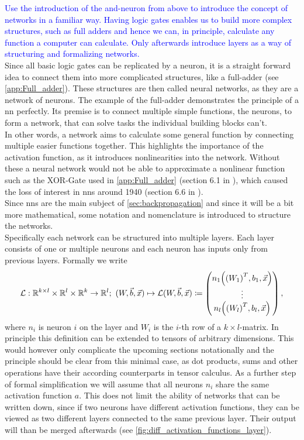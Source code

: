 \medskip
\textcolor{blue}{Use the introduction of the and-neuron from above to introduce the concept of networks in a familiar way. Having logic gates enables us to build more complex structures, such as full adders and hence we can, in principle, calculate any function a computer can calculate. Only afterwards introduce layers as a way of structuring and formalizing networks.}\\
\noindent Since all basic logic gates can be replicated by a neuron, it is a straight forward idea to connect them into more complicated structures, like a full-adder (see \autoref{app:Full_adder}). These structures are then called neural networks, as they are a network of neurons. The example of the full-adder demonstrates the principle of a \gls{nn} perfectly. Its premise is to connect multiple simple functions, the neurons, to form a network, that can solve tasks the individual building blocks can't.\\
In other words, a network aims to calculate some general function by connecting multiple easier functions together. This highlights the importance of the activation function, as it introduces nonlinearities into the network. Without these a neural network would not be able to approximate a nonlinear function such as the XOR-Gate used in \autoref{app:Full_adder} (section 6.1 in \cite{deep_learning_book}), which caused the loss of interest in \gls{nns} around 1940 (section 6.6 in \cite{deep_learning_book}).\medskip\\
Since \gls{nns} are the main subject of \autoref{sec:backpropagation} and since it will be a bit more mathematical, some notation and nomenclature is introduced to structure the networks.\\
Specifically each network can be structured into multiple layers. Each layer consists of one or multiple neurons and each neuron has inputs only from previous layers. Formally we write
\begin{equation}
\mathcal{L}:\mathbb{R}^{k\times l}\times\mathbb{R}^l\times\mathbb{R}^k\to\mathbb{R}^l;\ (W, \vec{b}, \vec{x})\mapsto\mathcal{L}(W,\vec{b},\vec{x})\coloneqq
\begin{pmatrix}
n_1{\left( {(W_1)}^T,b_1,\vec{x} \right)}\\
\vdots\\
n_l{\left( {(W_l)}^T,b_l,\vec{x} \right)}
\end{pmatrix},
\end{equation}
where $n_i$ is neuron $i$ on the layer and $W_i$ is the $i$-th row of a $k\times l$-matrix. In principle this definition can be extended to tensors of arbitrary dimensions. This would however only complicate the upcoming sections notationally and the principle should be clear from this minimal case, as dot products, sums and other operations have their according counterparts in tensor calculus. As a further step of formal simplification we will assume that all neurons $n_i$ share the same activation function $a$. This does not limit the ability of networks that can be written down, since if two neurons have different activation functions, they can be viewed as two different layers connected to the same previous layer. Their output will than be merged afterwards (see \autoref{fig:diff_activation_functions_layer}).\\

